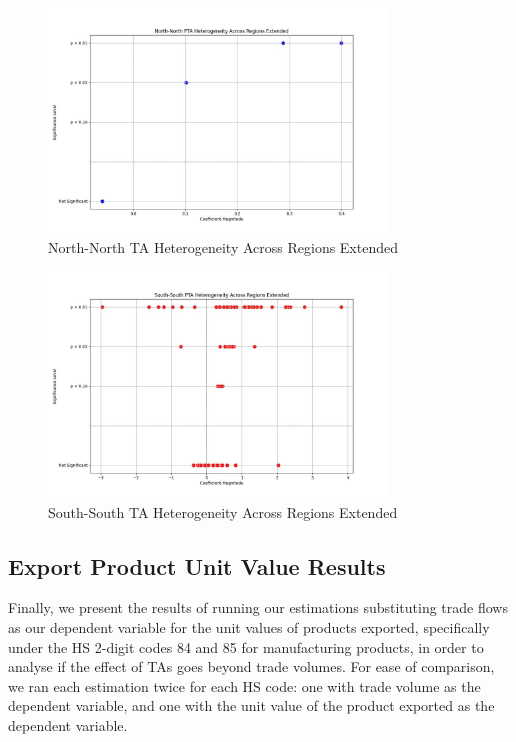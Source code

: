 \documentclass[12pt]{article}%
\begin{document}
%


\begin{figure}[h!]%
\centering%
\includegraphics[width=0.8\textwidth]{figures/North-North_trade_relationships_visualization.jpeg}%
\caption{North{-}North TA Heterogeneity Across Regions Extended}%
\end{figure}

%


\begin{figure}[h!]%
\centering%
\includegraphics[width=0.8\textwidth]{figures/South-South_trade_relationships_visualization.jpeg}%
\caption{South{-}South TA Heterogeneity Across Regions Extended}%
\end{figure}

%
\FloatBarrier

%
\subsection{Export Product Unit Value Results}%
\label{subsec:ExportProductUnitValueResults}%
Finally, we present the results of running our estimations substituting
trade flows as our dependent variable for the unit values of products
exported, specifically under the HS 2-digit codes 84 and 85 for
manufacturing products, in order to analyse if the effect of TAs goes
beyond trade volumes. For ease of comparison, we ran each estimation
twice for each HS code: one with trade volume as the dependent variable,
and one with the unit value of the product exported as the dependent
variable.
\end{document}
